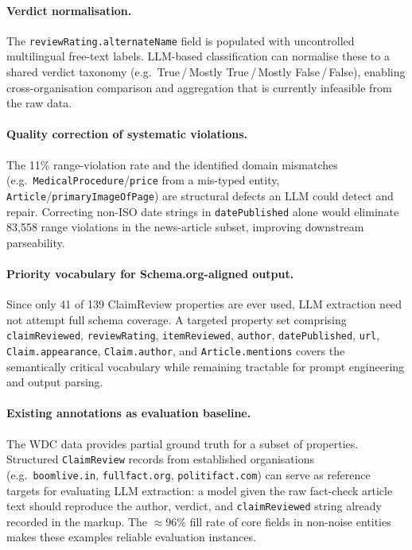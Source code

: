 \documentclass[11pt,a4paper]{article}
\begin{document}
\paragraph{Verdict normalisation.}
The \texttt{reviewRating.alternateName} field is populated with
uncontrolled multilingual free-text labels.  LLM-based classification
can normalise these to a shared verdict taxonomy (e.g.\
True\,/\,Mostly True\,/\,Mostly False\,/\,False), enabling
cross-organisation comparison and aggregation that is currently
infeasible from the raw data.

\paragraph{Quality correction of systematic violations.}
The 11\% range-violation rate and the identified domain mismatches
(e.g.\ \texttt{MedicalProcedure}/\texttt{price} from a mis-typed entity,
\texttt{Article}/\texttt{primaryImageOfPage}) are structural defects an
LLM could detect and repair.  Correcting non-ISO date strings in
\texttt{datePublished} alone would eliminate 83{,}558 range violations
in the news-article subset, improving downstream parseability.

\paragraph{Priority vocabulary for Schema.org-aligned output.}
Since only 41 of 139 ClaimReview properties are ever used, LLM extraction
need not attempt full schema coverage.  A targeted property set comprising
\texttt{claimReviewed}, \texttt{reviewRating}, \texttt{itemReviewed},
\texttt{author}, \texttt{datePublished}, \texttt{url},
\texttt{Claim.appearance}, \texttt{Claim.author}, and
\texttt{Article.mentions} covers the semantically critical vocabulary
while remaining tractable for prompt engineering and output parsing.

\paragraph{Existing annotations as evaluation baseline.}
The WDC data provides partial ground truth for a subset of properties.
Structured \texttt{ClaimReview} records from established organisations
(e.g.\ \texttt{boomlive.in}, \texttt{fullfact.org},
\texttt{politifact.com}) can serve as reference targets for evaluating
LLM extraction: a model given the raw fact-check article text should
reproduce the author, verdict, and \texttt{claimReviewed} string already
recorded in the markup.  The $\approx$96\% fill rate of core fields in
non-noise entities makes these examples reliable evaluation instances.
\end{document}
